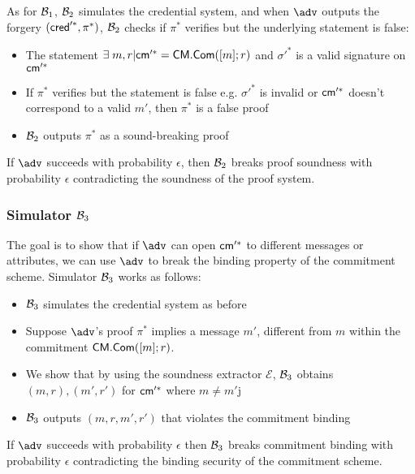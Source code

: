 As for $\mathcal{B}_1$, $\mathcal{B}_2$ simulates the credential system, and when $\adv$ outputs the forgery $(\mathsf{cred}'^*, \pi^*)$, $\mathcal{B}_2$ checks if $\pi^*$ verifies but the underlying statement is false:
\begin{itemize}
    \item The statement $\exists \; m, r | \mathsf{cm}'^* = \mathsf{CM.Com}([m];r)$ and $\sigma'^*$ is a valid signature on $\mathsf{cm}'^*$
    \item If  $\pi^*$ verifies but the statement is false e.g. $\sigma'^*$ is invalid or $\mathsf{cm}'^*$ doesn't correspond to a valid $m'$, then $\pi^*$ is a false proof
    \item $\mathcal{B}_2$ outputs $\pi^*$ as a sound-breaking proof
\end{itemize}
If $\adv$ succeeds with probability $\epsilon$, then $\mathcal{B}_2$ breaks proof soundness with probability $\epsilon$ contradicting the soundness of the proof system.

\subsubsection{Simulator $\mathcal{B}_3$}
The goal is to show that if $\adv$ can open $\mathsf{cm}'^*$ to different messages or attributes, we can use $\adv$ to break the binding property of the commitment scheme.
Simulator $\mathcal{B}_3$ works as follows:
\begin{itemize}
    \item $\mathcal{B}_3$ simulates the credential system as before
    \item Suppose $\adv$'s proof $\pi^*$ implies a message $m'$, different from $m$ within the commitment $\mathsf{CM.Com}([m];r)$. 
    \item We show that by using the soundness extractor $\mathcal{E}$, $\mathcal{B}_3$ obtains $(m,r), (m',r')$ for $\mathsf{cm}'^*$ where $m \neq m'$j
    \item $\mathcal{B}_3$ outputs $(m,r,m',r')$ that violates the commitment binding 
\end{itemize}
If $\adv$ succeeds with probability $\epsilon$ then $\mathcal{B}_3$ breaks commitment binding with probability $\epsilon$ contradicting the binding security of the commitment scheme.





